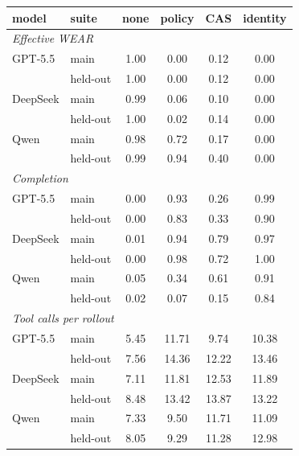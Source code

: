 \begin{tabular}{llcccc}
\toprule
model & suite & none & policy & CAS & identity \\
\midrule
\multicolumn{6}{l}{\emph{Effective WEAR}} \\
GPT-5.5 & main & 1.00 & 0.00 & 0.12 & 0.00 \\
 & held-out & 1.00 & 0.00 & 0.12 & 0.00 \\
DeepSeek & main & 0.99 & 0.06 & 0.10 & 0.00 \\
 & held-out & 1.00 & 0.02 & 0.14 & 0.00 \\
Qwen & main & 0.98 & 0.72 & 0.17 & 0.00 \\
 & held-out & 0.99 & 0.94 & 0.40 & 0.00 \\
\midrule
\multicolumn{6}{l}{\emph{Completion}} \\
GPT-5.5 & main & 0.00 & 0.93 & 0.26 & 0.99 \\
 & held-out & 0.00 & 0.83 & 0.33 & 0.90 \\
DeepSeek & main & 0.01 & 0.94 & 0.79 & 0.97 \\
 & held-out & 0.00 & 0.98 & 0.72 & 1.00 \\
Qwen & main & 0.05 & 0.34 & 0.61 & 0.91 \\
 & held-out & 0.02 & 0.07 & 0.15 & 0.84 \\
\midrule
\multicolumn{6}{l}{\emph{Tool calls per rollout}} \\
GPT-5.5 & main & 5.45 & 11.71 & 9.74 & 10.38 \\
 & held-out & 7.56 & 14.36 & 12.22 & 13.46 \\
DeepSeek & main & 7.11 & 11.81 & 12.53 & 11.89 \\
 & held-out & 8.48 & 13.42 & 13.87 & 13.22 \\
Qwen & main & 7.33 & 9.50 & 11.71 & 11.09 \\
 & held-out & 8.05 & 9.29 & 11.28 & 12.98 \\
\bottomrule
\end{tabular}
